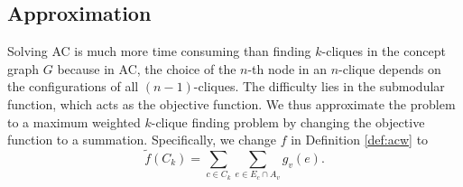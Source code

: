 

%

%

%

\subsection{Approximation}
Solving AC is much more time consuming than finding $k$-cliques in the
concept graph $G$ because in AC, the choice of the $n$-th node in an $n$-clique
depends on the configurations of all $(n-1)$-cliques.
The difficulty lies in the submodular function, which acts
as the objective function.
We thus approximate the problem to a maximum weighted $k$-clique finding
problem by changing the objective function
to a summation. Specifically, we change $f$ in Definition \ref{def:acw} to
\begin{equation}
\tilde{f}(C_k)=\sum_{c\in C_k}{\sum_{e\in E_c\cap A_v}{g_v(e)}}.
\label{eq:approxf}
\end{equation}

